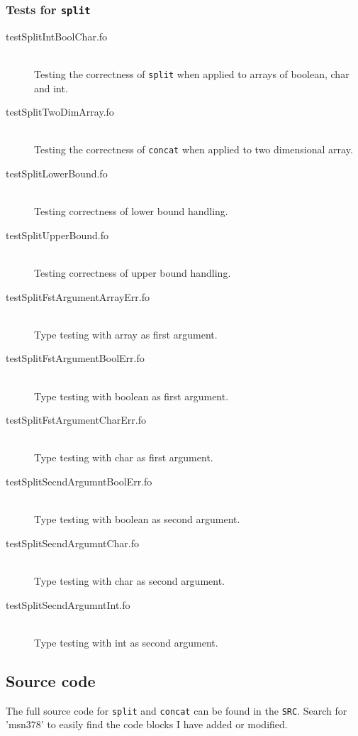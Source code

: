 \documentclass[11pt,a4paper]{article}
\begin{document}
\subsubsection{Tests for \texttt{split}}

\begin{description}
  \item[testSplitIntBoolChar.fo] \hfill \\
  Testing the correctness of \texttt{split} when applied to arrays of boolean,
  char and int.
  \item[testSplitTwoDimArray.fo] \hfill \\
  Testing the correctness of \texttt{concat} when applied to two dimensional
  array.
  \item[testSplitLowerBound.fo] \hfill \\
  Testing correctness of lower bound handling.
  \item[testSplitUpperBound.fo] \hfill \\
  Testing correctness of upper bound handling.
  \item[testSplitFstArgumentArrayErr.fo] \hfill \\
  Type testing with array as first argument.
  \item[testSplitFstArgumentBoolErr.fo] \hfill \\
  Type testing with boolean as first argument.
  \item[testSplitFstArgumentCharErr.fo] \hfill \\
  Type testing with char as first argument.
  \item[testSplitSecndArgumntBoolErr.fo] \hfill \\
  Type testing with boolean as second argument.
  \item[testSplitSecndArgumntChar.fo] \hfill \\
  Type testing with char as second argument.
  \item[testSplitSecndArgumntInt.fo] \hfill \\
  Type testing with int as second argument.
\end{description}

\subsection{Source code}
The full source code for \texttt{split} and \texttt{concat} can be found in
the \texttt{SRC}. Search for 'msn378' to easily find the code blocks I have
added or modified.
\end{document}
